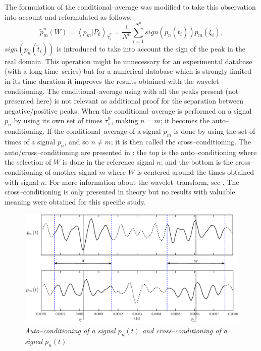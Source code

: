 The formulation of the conditional--average was modified to take this observation into account and reformulated as follows:
\begin{equation} \label{eqn:condAvgSign}
\tilde{p}_{m}^n\left( W \right) = \left< p_{m} | P_{k} \right>_{\tilde{\tau}^n_{s}} = \frac{1}{N^n} \sum^{N^n}_{i = 1} sign\left( p_{n} \left( \tilde{t}_{i} \right) \right) p_{m} \left( \xi_{i} \right),
\end{equation}
$sign\left( p_{n} \left( \tilde{t}_{i} \right) \right)$ is introduced to take into account the sign of the peak in the real domain. This operation might be unnecessary for an experimental database (with a long time--series) but for a numerical database which is strongly limited in its time duration it improves the results obtained with the wavelet--conditioning.
The conditional--average using  with all the peaks present (not presented here) is not relevant as additional proof for the separation between negative/positive peaks.
When the conditional--average is performed on a signal $p_{n}$ by using its own set of times ${\tilde{\tau}^n_{s}}$, making $n = m$; it becomes the auto--conditioning. If the conditional--average of a signal $p_{m}$ is done by using the set of times of a signal $p_{n}$, and so $n \neq m$; it is then called the cross--conditioning. The auto/cross--conditioning are presented in : the top is the auto--conditioning where the selection of $W$ is done in the reference signal $n$; and the bottom is the cross--conditioning of another signal $m$ where $W$ is centered around the times obtained with signal $n$. For more information about the wavelet--transform, see \cite{Farge1992}. The cross--conditioning is only presented in theory but no results with valuable meaning were obtained for this specific study.
\begin{figure}
	\centering
	\includegraphics[width=1\textwidth]{Figures/condNcond.eps}
	\caption{\textit{Auto--conditioning of a signal $p_n(t)$ and cross--conditioning of a signal $p_n(t)$}}
	\label{fig:condNcond}
\end{figure}

